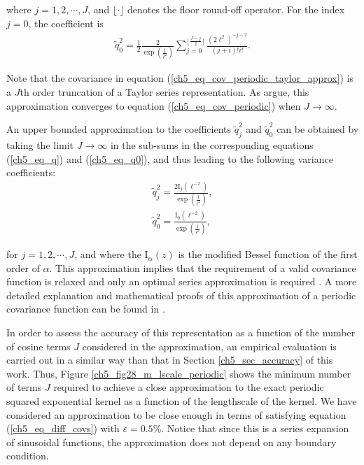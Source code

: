 \documentclass[onecolumn,a4paper,11pt]{article}
\begin{document}
\noindent where $j=1,2,\cdots,J$, and $\lfloor \cdot \rfloor$ denotes the floor round-off operator. For the index $j=0$, the coefficient is 
%
\begin{eqnarray} \label{ch5_eq_q0}
\tilde{q}_0^2= \frac{1}{2} \frac{2}{\exp\left(\frac{1}{\ell^2}\right)} \sum_{j=0}^{\lfloor \frac{J-j}{2} \rfloor} \frac{(2\ell^2)^{-j-2}}{(j+i)!i!}.
\end{eqnarray}
 
\noindent Note that the covariance in equation (\ref{ch5_eq_cov_periodic_taylor_approx}) is a $J$th order truncation of a Taylor series representation. As \cite{solin2014explicit} argue, this approximation converges to equation (\ref{ch5_eq_cov_periodic}) when $J \rightarrow \infty$.

An upper bounded approximation to the coefficients $\tilde{q}_j^2$ and $\tilde{q}_0^2$ can be obtained by taking the limit $J \rightarrow \infty$ in the sub-sums in the corresponding equations (\ref{ch5_eq_q}) and (\ref{ch5_eq_q0}), and thus leading to the following variance coefficients:
%
\begin{equation}\label{ch5_eq_q_2}
\begin{split}
\tilde{q}_j^2= \frac{2\text{I}_j(\ell^{-2})}{\exp\left(\frac{1}{\ell^2}\right)}, \\
\tilde{q}_0^2= \frac{\text{I}_0(\ell^{-2})}{\exp\left(\frac{1}{\ell^2}\right)},
\end{split}
\end{equation} 

\noindent for $j=1,2,\cdots,J$, and where the $\text{I}_{\alpha}(z)$ is the modified Bessel function \citep{handbook1970m} of the first order of $\alpha$. This approximation implies that the requirement of a valid covariance function is relaxed and only an optimal series approximation is required \citep{solin2014explicit}. A more detailed explanation and mathematical proofs of this approximation of a periodic covariance function can be found in \cite{solin2014explicit}. 



In order to assess the accuracy of this representation as a function of the number of cosine terms $J$ considered in the approximation, an empirical evaluation is carried out in a similar way than that in Section \ref{ch5_sec_accuracy} of this work. Thus, Figure \ref{ch5_fig28_m_lscale_periodic} shows the minimum number of terms $J$ required to achieve a close approximation to the exact periodic squared exponential kernel as a function of the lengthscale of the kernel. We have considered an approximation to be close enough in terms of satisfying equation (\ref{ch5_eq_diff_covs}) with $\varepsilon=0.5\%$. Notice that since this is a series expansion of sinusoidal functions, the approximation does not depend on any boundary condition.
\end{document}
